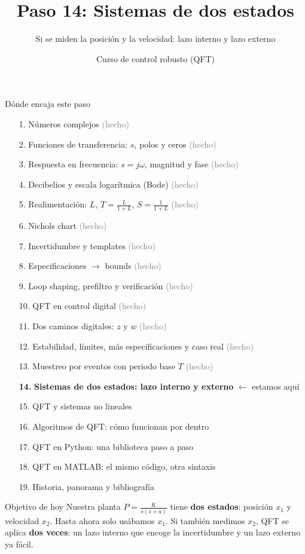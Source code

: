 \documentclass[aspectratio=169,11pt]{beamer}
\title[Dos estados]{Paso 14: Sistemas de dos estados}
\subtitle{Si se miden la posición y la velocidad: lazo interno y lazo externo}
\author{Curso de control robusto (QFT)}
\date{}
\begin{document}
\begin{frame}\titlepage\end{frame}

\begin{frame}{Dónde encaja este paso}
  \tiny
  \begin{enumerate}\setlength{\itemsep}{-2pt}
    \item[1.] Números complejos \hfill \textcolor{gray}{(hecho)}
    \item[2.] Funciones de transferencia: $s$, polos y ceros \hfill \textcolor{gray}{(hecho)}
    \item[3.] Respuesta en frecuencia: $s=j\omega$, magnitud y fase \hfill \textcolor{gray}{(hecho)}
    \item[4.] Decibelios y escala logarítmica (Bode) \hfill \textcolor{gray}{(hecho)}
    \item[5.] Realimentación: $L$, $T=\frac{L}{1+L}$, $S=\frac{1}{1+L}$ \hfill \textcolor{gray}{(hecho)}
    \item[6.] Nichols chart \hfill \textcolor{gray}{(hecho)}
    \item[7.] Incertidumbre y templates \hfill \textcolor{gray}{(hecho)}
    \item[8.] Especificaciones $\rightarrow$ bounds \hfill \textcolor{gray}{(hecho)}
    \item[9.] Loop shaping, prefiltro y verificación \hfill \textcolor{gray}{(hecho)}
    \item[10.] QFT en control digital \hfill \textcolor{gray}{(hecho)}
    \item[11.] Dos caminos digitales: $z$ y $w$ \hfill \textcolor{gray}{(hecho)}
    \item[12.] Estabilidad, límites, más especificaciones y caso real \hfill \textcolor{gray}{(hecho)}
    \item[13.] Muestreo por eventos con periodo base $T$ \hfill \textcolor{gray}{(hecho)}
    \item[\textbf{14.}] \textbf{Sistemas de dos estados: lazo interno y externo} \hfill $\leftarrow$ estamos aquí
    \item[15.] QFT y sistemas no lineales
    \item[16.] Algoritmos de QFT: cómo funcionan por dentro
    \item[17.] QFT en Python: una biblioteca paso a paso
    \item[18.] QFT en MATLAB: el mismo código, otra sintaxis
    \item[19.] Historia, panorama y bibliografía
  \end{enumerate}
  \vspace{2pt}
  \begin{block}{Objetivo de hoy}
    Nuestra planta $P=\frac{K}{s(s+a)}$ tiene \textbf{dos estados}: posición $x_1$ y velocidad $x_2$. Hasta ahora solo usábamos $x_1$. Si también medimos $x_2$, QFT se aplica \textbf{dos veces}: un lazo interno que encoge la incertidumbre y un lazo externo ya fácil.
  \end{block}
\end{frame}
\end{document}
